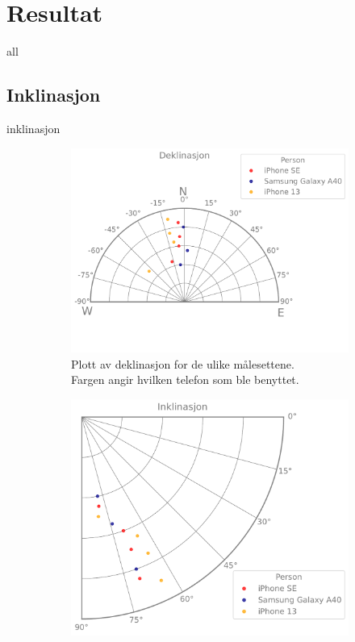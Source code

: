 \section{Resultat}

{all}

\subsection{Inklinasjon}

{inklinasjon}

\begin{figure}
    \centering
\begin{subfigure}{.5\textwidth}
    \includegraphics[width=1\textwidth]{Plots/declination.pdf}
    \caption{Plott av deklinasjon for de ulike målesettene. \\
    Fargen angir hvilken telefon som ble benyttet.}
    \label{fig:plot_declination}
\end{subfigure}%
\begin{subfigure}{.5\textwidth}
    \includegraphics[width=1\textwidth]{Plots/inclination.pdf}

\end{subfigure}
\end{figure}
